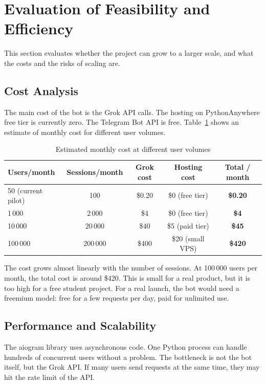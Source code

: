 \section{Evaluation of Feasibility and Efficiency}
\label{sec:feasibility}

This section evaluates whether the project can grow to a larger scale, and what the costs and the risks of scaling are.

\subsection{Cost Analysis}

The main cost of the bot is the Grok API calls. The hosting on PythonAnywhere free tier is currently zero. The Telegram Bot API is free. Table~\ref{tab:cost} shows an estimate of monthly cost for different user volumes.

\begin{table}[H]
\centering
\caption{Estimated monthly cost at different user volumes}
\label{tab:cost}
\begin{tabular}{lcccc}
\toprule
\textbf{Users/month} & \textbf{Sessions/month} & \textbf{Grok cost} & \textbf{Hosting cost} & \textbf{Total / month} \\
\midrule
50 (current pilot) & 100  & \$0.20 & \$0 (free tier) & \textbf{\$0.20} \\
1\,000              & 2\,000  & \$4    & \$0 (free tier) & \textbf{\$4} \\
10\,000             & 20\,000 & \$40   & \$5 (paid tier) & \textbf{\$45} \\
100\,000            & 200\,000 & \$400 & \$20 (small VPS) & \textbf{\$420} \\
\bottomrule
\end{tabular}
\end{table}

The cost grows almost linearly with the number of sessions. At 100\,000 users per month, the total cost is around \$420. This is small for a real product, but it is too high for a free student project. For a real launch, the bot would need a freemium model: free for a few requests per day, paid for unlimited use.

\subsection{Performance and Scalability}

The aiogram library uses asynchronous code. One Python process can handle hundreds of concurrent users without a problem. The bottleneck is not the bot itself, but the Grok API. If many users send requests at the same time, they may hit the rate limit of the API.

